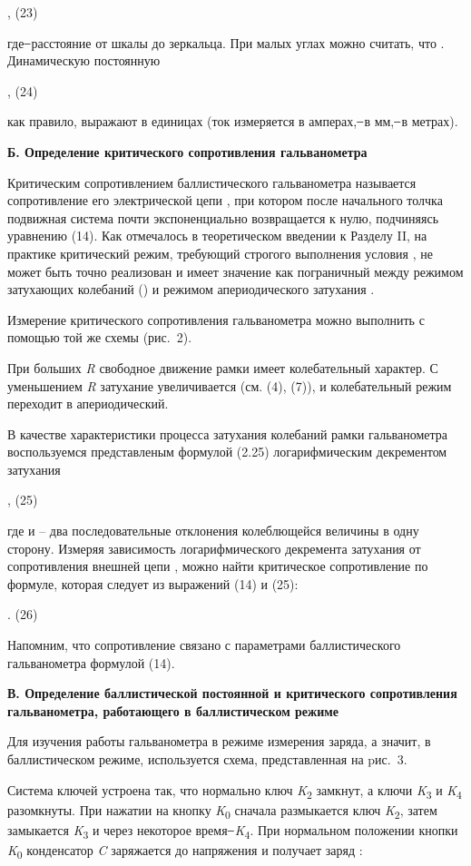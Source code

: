 \documentclass[]{article}
\begin{document}
, (23)

где ̶ расстояние от шкалы до зеркальца. При малых углах можно считать,
что . Динамическую постоянную

, (24)

как правило, выражают в единицах (ток измеряется в амперах, ̶ в мм, ̶ в
метрах).

\textbf{Б. Определение критического сопротивления гальванометра}

Критическим сопротивлением баллистического гальванометра называется
сопротивление его электрической цепи , при котором после начального
толчка подвижная система почти экспоненциально возвращается к нулю,
подчиняясь уравнению (14). Как отмечалось в теоретическом введении к
Разделу II, на практике критический режим, требующий строгого выполнения
условия , не может быть точно реализован и имеет значение как
пограничный между режимом затухающих колебаний () и режимом
апериодического затухания .

Измерение критического сопротивления гальванометра можно выполнить с
помощью той же схемы (рис.~2).

При больших \emph{R} свободное движение рамки имеет колебательный
характер. С уменьшением \emph{R} затухание увеличивается (см. (4), (7)),
и колебательный режим переходит в апериодический.

В качестве характеристики процесса затухания колебаний рамки
гальванометра воспользуемся представленым формулой (2.25)
логарифмическим декрементом затухания

, (25)

где и -- два последовательные отклонения колеблющейся величины в одну
сторону. Измеряя зависимость логарифмического декремента затухания от
сопротивления внешней цепи , можно найти критическое сопротивление по
формуле, которая следует из выражений (14) и (25):

. (26)

Напомним, что сопротивление связано с параметрами баллистического
гальванометра формулой (14).

\textbf{В. Определение баллистической постоянной и критического
сопротивления гальванометра, работающего в баллистическом режиме}

Для изучения работы гальванометра в режиме измерения заряда, а значит, в
баллистическом режиме, используется схема, представленная на pис.~3.

Система ключей устроена так, что нормально ключ
\emph{K}\textsubscript{2} замкнут, а ключи \emph{K}\textsubscript{3} и
\emph{K}\textsubscript{4} разомкнуты. При нажатии на кнопку
\emph{K}\textsubscript{0} сначала размыкается ключ
\emph{K}\textsubscript{2}, затем замыкается \emph{K}\textsubscript{3} и
через некоторое время ̶ \emph{K}\textsubscript{4}. При нормальном
положении кнопки \emph{K}\textsubscript{0} конденсатор \emph{C}
заряжается до напряжения и получает заряд :
\end{document}
